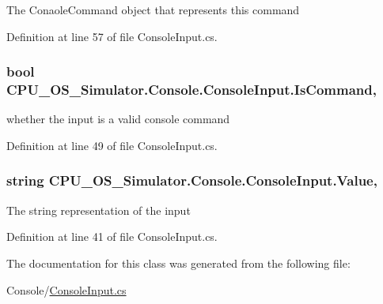 The Conaole\+Command object that represents this command 



Definition at line 57 of file Console\+Input.\+cs.

\hypertarget{class_c_p_u___o_s___simulator_1_1_console_1_1_console_input_a41ebc5e7f419f80fe60ee45e54492d7e}{}
\subsubsection[{Is\+Command}]{\setlength{\rightskip}{0pt plus 5cm}bool C\+P\+U\+\_\+\+O\+S\+\_\+\+Simulator.\+Console.\+Console\+Input.\+Is\+Command\hspace{0.3cm}{\ttfamily [get]}, {\ttfamily [set]}}\label{class_c_p_u___o_s___simulator_1_1_console_1_1_console_input_a41ebc5e7f419f80fe60ee45e54492d7e}


whether the input is a valid console command 



Definition at line 49 of file Console\+Input.\+cs.

\hypertarget{class_c_p_u___o_s___simulator_1_1_console_1_1_console_input_a2ad81ef96300694cbfe63aa02d098bf2}{}
\subsubsection[{Value}]{\setlength{\rightskip}{0pt plus 5cm}string C\+P\+U\+\_\+\+O\+S\+\_\+\+Simulator.\+Console.\+Console\+Input.\+Value\hspace{0.3cm}{\ttfamily [get]}, {\ttfamily [set]}}\label{class_c_p_u___o_s___simulator_1_1_console_1_1_console_input_a2ad81ef96300694cbfe63aa02d098bf2}


The string representation of the input 



Definition at line 41 of file Console\+Input.\+cs.



The documentation for this class was generated from the following file\+:\begin{DoxyCompactItemize}
\item 
Console/\hyperlink{_console_input_8cs}{Console\+Input.\+cs}\end{DoxyCompactItemize}
